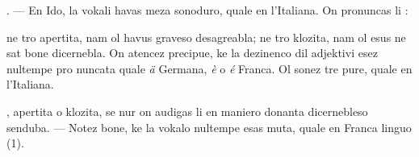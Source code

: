 \begin{VUpage}[15]{}
\VUblancAlinea
\VUsaut{5.26mm}
\VUsaut{3.54mm}

. --- En Ido, la vokali havas meza sonoduro, quale en\nl
l'Italiana. On pronuncas li :

\VUblancAlinea
{} ne tro apertita, nam ol havus graveso desagreabla; ne\nl
tro klozita, nam ol esus ne sat bone dicernebla. On atencez\nl
precipue, ke la dezinenco  dil adjektivi esez nultempe pro\cc
nuncata quale \textit{ä} Germana, \textit{è} o \textit{é} Franca. Ol sonez  tre pure,\nl
quale en l'Italiana.

\VUblancAlinea
{},  apertita o klozita, se nur on audigas li en maniero\nl
donanta dicernebleso senduba. --- Notez bone, ke la vokalo \nl
nultempe esas muta, quale en Franca linguo (1).

\end{VUpage}

